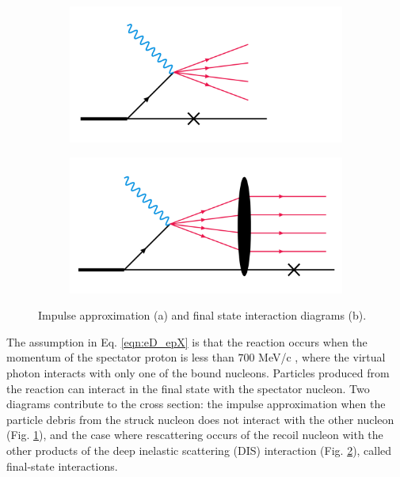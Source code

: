 \begin{figure}
	\centering
	\begin{subfigure}[b]{0.4\linewidth}
		\includegraphics[width=\linewidth]{figures/spec_tag1.png}
		\caption{}
		\label{fig:spec_tag1}
	\end{subfigure}
	\begin{subfigure}[b]{0.4\linewidth}
		\includegraphics[width=\linewidth]{figures/spec_tag2.png}
		\caption{}
		\label{fig:spec_tag2}
	\end{subfigure}
	\caption{Impulse approximation (a) and final state interaction diagrams (b).}
	\label{fig:spec_tag}
\end{figure}

The assumption in Eq. \ref{eqn:eD_epX} is that the reaction occurs when the momentum of the spectator proton is less than $700$ MeV/c \cite{spec_tag}, where the virtual photon interacts with only one of the bound nucleons. Particles produced from the reaction can interact in the final state with the spectator nucleon. Two diagrams contribute to the cross section: the impulse approximation when the particle debris from the struck nucleon does not interact with the other nucleon (Fig. \ref{fig:spec_tag1}), and the case where rescattering occurs of the recoil nucleon with the other products of the deep inelastic scattering (DIS) interaction (Fig. \ref{fig:spec_tag2}), called final-state interactions.

